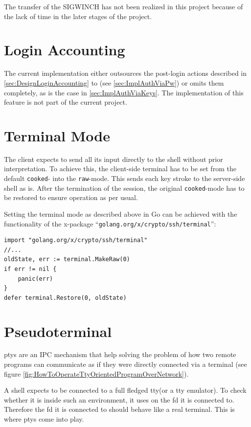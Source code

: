 \documentclass[10pt,a4paper,titlepage,twoside,english,final]{zhawreprt}
\begin{document}
The transfer of the \gls{SIGWINCH} has not been realized in this project because of the lack of time in the later stages of the project.


\section{Login Accounting}\label{sec:ImplLoginAccounting}
The current implementation either outsources the post-\gls{login} actions described in \ref{sec:DesignLoginAccounting} to \cite{login}(see \ref{sec:ImplAuthViaPw}) or omits them completely, as is the case in \ref{sec:ImplAuthViaKeys}.
The implementation of this feature is not part of the current project.

\section{Terminal Mode}\label{sec:ImplTerminalMode}
The client expects to send all its input directly to the \gls{shell} without prior interpretation.
To achieve this, the client-side \gls{terminal} has to be set from the default \texttt{cooked}- into the \texttt{raw}-mode\citep[p.1309]{KerriskTLPI}.
This sends each key stroke to the server-side \gls{shell} as is.
After the termination of the session, the original \texttt{cooked}-mode has to be restored to ensure operation as per usual.

Setting the \gls{terminal} mode as described above in \gls{Go} can be achieved with the functionality of the \gls{x-package} ``\texttt{golang.org/x/crypto/ssh/terminal}'':
\setlistingGo
\begin{lstlisting}[caption={Setting the \gls{terminal} mode in \gls{Go}},label=lst:GoTermMode]
import "golang.org/x/crypto/ssh/terminal"
//...
oldState, err := terminal.MakeRaw(0)
if err != nil {
	panic(err)
}
defer terminal.Restore(0, oldState)
\end{lstlisting}

\section{Pseudoterminal}\label{sec:ImplPseudoterminal}
\glspl{pty} are an \gls{IPC} mechanism that help solving the problem of how two remote programs can communicate as if they were directly connected via a \gls{terminal} (see figure \ref{fig:HowToOperateTtyOrientedProgramOverNetwork}).

A \gls{shell} expects to be connected to a full fledged \gls{tty}(or a \gls{tty} emulator).
To check whether it is inside such an environment, it uses \cite{isatty} on the \gls{fd} it is connected to.
Therefore the \gls{fd} it is connected to should behave like a real \gls{terminal}.
This is where \glspl{pty} come into play.
\end{document}
